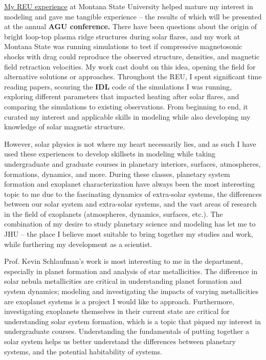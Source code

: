 \documentclass[11pt,letterpaper]{article}
\begin{document}
\href{http://solar.physics.montana.edu/www/reu/2021/mccreery/}{My REU experience} at Montana State University helped mature my interest in modeling and gave me tangible experience – the results of which will be presented at the annual \textbf{AGU conference.} There have been questions about the origin of bright loop-top plasma ridge structures during solar flares, and my work at Montana State was running simulations to test if compressive magnetosonic shocks with drag could reproduce the observed structure, densities, and magnetic field retraction velocities. My work cast doubt on this idea, opening the field for alternative solutions or approaches. Throughout the REU, I spent significant time reading papers, scouring the \textbf{IDL} code of the simulations I was running, exploring different parameters that impacted heating after solar flares, and comparing the simulations to existing observations. From beginning to end, it curated my interest and applicable skills in modeling while also developing my knowledge of solar magnetic structure. 

However, solar physics is not where my heart necessarily lies, and as such I have used these experiences to develop skillsets in modeling while taking undergraduate and graduate courses in planetary interiors, surfaces, atmospheres, formations, dynamics, and more. During these classes, planetary system formation and exoplanet characterization have always been the most interesting topic to me due to the fascinating dynamics of extra-solar systems, the differences between our solar system and extra-solar systems, and the vast areas of research in the field of exoplanets (atmospheres, dynamics, surfaces, etc.). The combination of my desire to study planetary science and modeling has let me to JHU -- the place I believe most suitable to bring together my studies and work, while furthering my development as a scientist.

Prof. Kevin Schlaufman's work is most interesting to me in the department, especially in planet formation and analysis of star metallicities. The difference in solar nebula metallicities are critical in understanding planet formation and system dynamics; modeling and investigating the impacts of varying metallicities are exoplanet systems is a project I would like to approach. Furthermore, investigating exoplanets themselves in their current state are critical for understanding solar system formation, which is a topic that piqued my interest in undergraduate courses. Understanding the fundamentals of putting together a solar system helps us better understand the differences between planetary systems, and the potential habitability of systems. 
\end{document}
